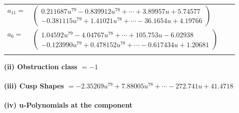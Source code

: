 \documentclass[1p]{elsarticle_modified}
\theoremstyle{definition}
\begin{document}
\begin{tabular}{m{7pt} m{180pt} m{7pt} m{180pt} }
\flushright $a_{11}=$&$\begin{pmatrix}0.211687 u^{79}-0.839912 u^{78}+\cdots+3.89957 u+5.74577\\-0.381115 u^{79}+1.41021 u^{78}+\cdots-36.1654 u+4.19766\end{pmatrix}$ \\
\flushright $a_{6}=$&$\begin{pmatrix}1.04592 u^{79}-4.04767 u^{78}+\cdots+105.753 u-6.02938\\-0.123990 u^{79}+0.478152 u^{78}+\cdots-0.617434 u+1.20681\end{pmatrix}$\\&\end{tabular}
\flushleft \textbf{(ii) Obstruction class $= -1$}\\~\\
\flushleft \textbf{(iii) Cusp Shapes $= -2.35269 u^{79}+7.88005 u^{78}+\cdots-272.741 u+41.4718$}\\~\\
\newpage\renewcommand{\arraystretch}{1}
\flushleft \textbf{(iv) u-Polynomials at the component}\newline \\
\end{document}
